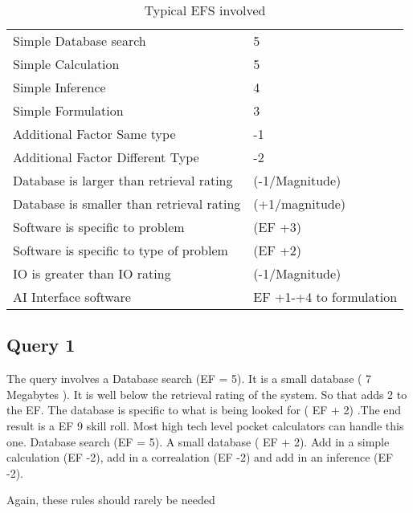 \begin{table}[htb]
\caption{Typical EFS involved}
	\begin{tabular}{||l|l||} \hline
	Simple Database search      & 5 \\
	Simple Calculation          & 5 \\
	Simple Inference            & 4 \\
	Simple Formulation          & 3 \\ \hline

	Additional Factor Same type & -1 \\
	Additional Factor Different Type & -2 \\
	Database is larger than retrieval rating  & (-1/Magnitude) \\
	Database is smaller than retrieval rating & (+1/magnitude) \\
	Software is specific to problem           & (EF +3) \\
	Software is specific to type of problem   & (EF +2) \\
	IO is greater than IO rating              & (-1/Magnitude) \\ \hline

	AI Interface software                     & EF +1-+4 to formulation \\ \hline
	\end{tabular}
\end{table}

\subsection{Query 1}
The query involves a Database search (EF = 5). It is a small
database ( 7 Megabytes ). It is well below the retrieval rating of
the system. So that adds 2 to the EF. The database is specific to
what is being looked for ( EF + 2) .The end result is a EF 9 skill
roll. Most high tech level pocket calculators can handle this one.
Database search (EF = 5). A small database ( EF + 2). Add in a
simple calculation (EF -2), add in a correalation (EF -2) and add in
an inference (EF -2).

Again, these rules should rarely be needed


